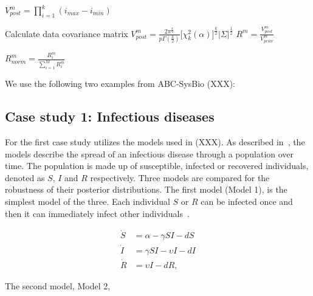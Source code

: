 {\begin{algorithm}[H]
\begin{algorithmic}[1]
    		\State $V_{post}^{m} = \prod_{i=1}^{k} (i_{max} - i_{min})$ \
    		
    		\EndIf
			
				\State Calculate data covariance matrix
    			\State $V_{post}^{m} = \frac{2\pi^{\frac{k}{2}}}{p\Gamma(\frac{k}{2})} \Big[ \chi _{k}^{2}(\alpha) \Big]^{\frac{k}{2}} |\Sigma|^\frac{1}{2}$
    		\EndIf
			\Statex
			\State $R^{m} = \frac{V_{post}^{m}}{V_{prior}^{m}}$
			
			\State $R_{norm}^{m} = \frac{R^{m}_i}{\sum_{i=1}^{M} R^m_i }$
		\EndFor
		
  \end{algorithmic}
\end{algorithm}	

We use the following two examples from ABC-SysBio (XXX):

\subsection{Case study 1: Infectious diseases}
\label{sec:cs1}

For the first case study utilizes the models used in (XXX). As described in~\textcite{Toni:2009tr}, the models describe the spread of an infectious disease through a population over time. The population is made up of susceptible, infected or recovered individuals, denoted as $S$, $I$ and $R$ respectively. Three models are compared for the robustness of their posterior distributions. The first model (Model 1), is the simplest model of the three. Each individual $S$ or $R$ can be infected once and then it can immediately infect other individuals~\autocite{Toni:2009tr}.

\begin{align*}
\dot S &= \alpha - \gamma SI - dS \\
\dot I &= \gamma SI - \upsilon I - dI \\
\dot R &= \upsilon I - dR,
\end{align*}

The second model, Model 2, 


}
